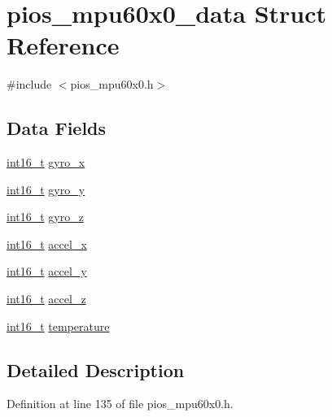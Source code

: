 \hypertarget{structpios__mpu60x0__data}{\section{pios\-\_\-mpu60x0\-\_\-data Struct Reference}
\label{structpios__mpu60x0__data}
}


{\ttfamily \#include $<$pios\-\_\-mpu60x0.\-h$>$}

\subsection*{Data Fields}
\begin{DoxyCompactItemize}
\item 
\hyperlink{stdint_8h_aa343fa3b3d06292b959ffdd4c4703b06}{int16\-\_\-t} \hyperlink{structpios__mpu60x0__data_a6369d6fde9747bdd53c2dda900377b0c}{gyro\-\_\-x}
\item 
\hyperlink{stdint_8h_aa343fa3b3d06292b959ffdd4c4703b06}{int16\-\_\-t} \hyperlink{structpios__mpu60x0__data_afdb7be8323e08a88d0e6c4909a868ad4}{gyro\-\_\-y}
\item 
\hyperlink{stdint_8h_aa343fa3b3d06292b959ffdd4c4703b06}{int16\-\_\-t} \hyperlink{structpios__mpu60x0__data_a526ba51edf822da11f9a97d1eef8c1e3}{gyro\-\_\-z}
\item 
\hyperlink{stdint_8h_aa343fa3b3d06292b959ffdd4c4703b06}{int16\-\_\-t} \hyperlink{structpios__mpu60x0__data_a5a5f295bda1bd7d7a3d00d02034a49e8}{accel\-\_\-x}
\item 
\hyperlink{stdint_8h_aa343fa3b3d06292b959ffdd4c4703b06}{int16\-\_\-t} \hyperlink{structpios__mpu60x0__data_a730c9c5aff6db5ecad97a13fba4da981}{accel\-\_\-y}
\item 
\hyperlink{stdint_8h_aa343fa3b3d06292b959ffdd4c4703b06}{int16\-\_\-t} \hyperlink{structpios__mpu60x0__data_a20c00b7ce03653dd56fc9bfe364eac75}{accel\-\_\-z}
\item 
\hyperlink{stdint_8h_aa343fa3b3d06292b959ffdd4c4703b06}{int16\-\_\-t} \hyperlink{structpios__mpu60x0__data_a799b825b01a55b144c922827bb39d5e1}{temperature}
\end{DoxyCompactItemize}


\subsection{Detailed Description}


Definition at line 135 of file pios\-\_\-mpu60x0.\-h.



